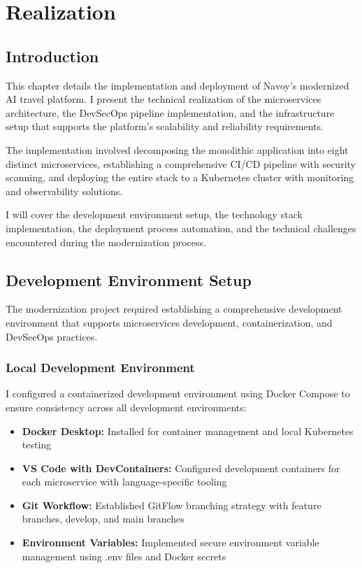 \chapter{Realization}
\minitoc
\newpage

\setcounter{secnumdepth}{0} %
\section{Introduction}
This chapter details the implementation and deployment of Navoy's modernized AI travel platform. I present the technical realization of the microservices architecture, the DevSecOps pipeline implementation, and the infrastructure setup that supports the platform's scalability and reliability requirements.

The implementation involved decomposing the monolithic application into eight distinct microservices, establishing a comprehensive CI/CD pipeline with security scanning, and deploying the entire stack to a Kubernetes cluster with monitoring and observability solutions.

I will cover the development environment setup, the technology stack implementation, the deployment process automation, and the technical challenges encountered during the modernization process.

\setcounter{secnumdepth}{2} %
\section{Development Environment Setup}
The modernization project required establishing a comprehensive development environment that supports microservices development, containerization, and DevSecOps practices.

\subsection{Local Development Environment}
I configured a containerized development environment using Docker Compose to ensure consistency across all development environments:

\begin{itemize}
    \item \textbf{Docker Desktop:} Installed for container management and local Kubernetes testing
    \item \textbf{VS Code with DevContainers:} Configured development containers for each microservice with language-specific tooling
    \item \textbf{Git Workflow:} Established GitFlow branching strategy with feature branches, develop, and main branches
    \item \textbf{Environment Variables:} Implemented secure environment variable management using .env files and Docker secrets
\end{itemize}

